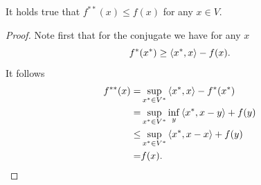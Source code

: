 \begin{lemma}
    It holds true that $f^{**}(x)\leq f(x)$ for any $x\in V$.
\end{lemma}
\begin{proof}
    Note first that for the conjugate we have for any $x$
    \begin{equation}
        f^*(x^*)\geq \left\langle x^* , x\right\rangle-f(x).
    \end{equation}
    It follows
    \begin{equation}
        \begin{aligned}
            f^{**}(x) 
            =& \sup_{x^*\in V^*}\left\langle x^* , x\right\rangle - f^*(x^*)\\
            =& \sup_{x^*\in V^*}\inf_y \left\langle x^* , x-y\right\rangle + f(y)\\
            \leq& \sup_{x^*\in V^*} \left\langle x^* , x-x\right\rangle + f(y)\\
            =& f(x).
        \end{aligned}
    \end{equation}
\end{proof}

